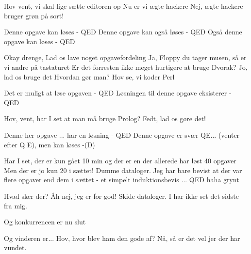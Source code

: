 \documentclass[a4paper,11pt]{article}
\begin{document}
\begin{sketch}

   Hov vent, vi skal lige sætte editoren op
   Nu er vi ægte hackere
   Nej, ægte hackere bruger grøn på sort!

   Denne opgave kan løses - QED
   Denne opgave kan også løses - QED
   Også denne opgave kan løses - QED

   Okay drenge, Lad os lave noget opgavefordeling
   Ja, Floppy du tager musen, så er vi andre på tastaturet
   Er det forresten ikke meget hurtigere at bruge Dvorak?
   Jo, lad os bruge det
   Hvordan gør man?
   Hov se, vi koder Perl

   Det er muligt at løse opgaven - QED
   Løsningen til denne opgave eksisterer - QED

   Hov, vent, har I set at man må bruge Prolog?
   Fedt, lad os gøre det!

   Denne her opgave ... har en løsning - QED
   Denne opgave er svær QE... (venter efter Q E), men kan løses -(D)

   Har I set, der er kun gået 10 min og der er en der allerede har løst 40 opgaver
   Men der er jo kun 20 i sættet!
   Dumme dataloger. Jeg har bare bevist at der var flere opgaver end dem i sættet - et simpelt induktionsbevis ... QED haha grynt 

   Hvad sker der? Åh nej, jeg er for god!
   Skide dataloger. I har ikke set det sidste fra mig.

   Og konkurrencen er nu slut

   Og vinderen er...
   Hov, hvor blev ham den gode af? Nå, så er det vel jer der har vundet.

\end{sketch}
\end{document}
